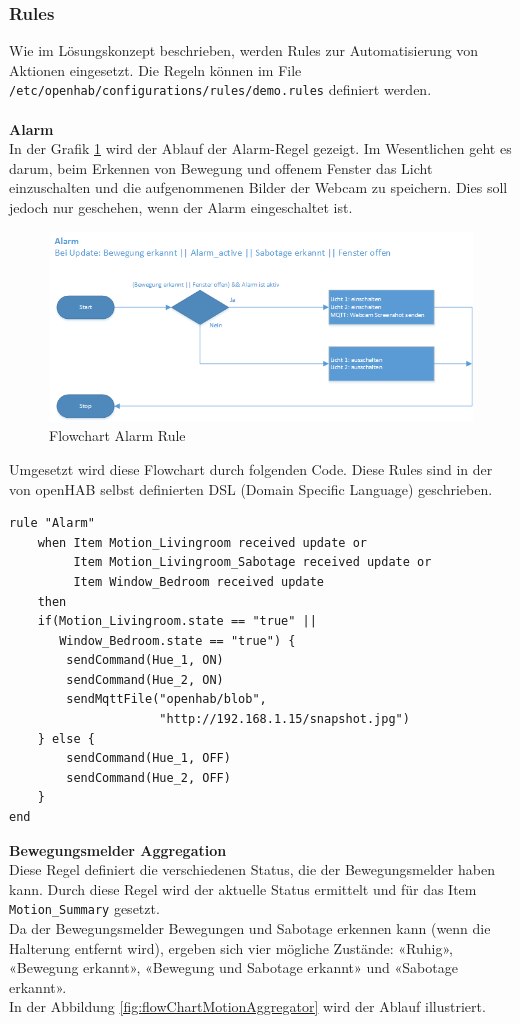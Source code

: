 \subsubsection{Rules}
Wie im Lösungskonzept beschrieben, werden Rules zur Automatisierung von Aktionen eingesetzt. Die Regeln können im File \lstinline!/etc/openhab/configurations/rules/demo.rules! definiert werden. \\\\
\textbf{Alarm} \\
In der Grafik \ref{fig:flowchartAlarm} wird der Ablauf der Alarm-Regel gezeigt. Im Wesentlichen geht es darum, beim Erkennen von Bewegung und offenem Fenster das Licht einzuschalten und die aufgenommenen Bilder der Webcam zu speichern. Dies soll jedoch nur geschehen, wenn der Alarm eingeschaltet ist.
\begin{figure}[H]
	\centering
		\includegraphics[scale=0.8]{report/img/RuleAlarm}
	\caption{Flowchart Alarm Rule}
	\label{fig:flowchartAlarm}
\end{figure}

Umgesetzt wird diese Flowchart durch folgenden Code. Diese Rules sind in der von openHAB selbst definierten DSL (Domain Specific Language) geschrieben.

\begin{lstlisting}[style=csharp, caption=demo.rules - Rule «Motion Aggregator»]
rule "Alarm"
	when Item Motion_Livingroom received update or
	     Item Motion_Livingroom_Sabotage received update or
	     Item Window_Bedroom received update
	then
	if(Motion_Livingroom.state == "true" ||
	   Window_Bedroom.state == "true") {
		sendCommand(Hue_1, ON)
		sendCommand(Hue_2, ON)
		sendMqttFile("openhab/blob",
					 "http://192.168.1.15/snapshot.jpg")
	} else {
		sendCommand(Hue_1, OFF)
		sendCommand(Hue_2, OFF)
	}
end
\end{lstlisting}

\textbf{Bewegungsmelder Aggregation} \\
Diese Regel definiert die verschiedenen Status, die der Bewegungsmelder haben kann. Durch diese Regel wird der aktuelle Status ermittelt und für das Item \lstinline!Motion_Summary! gesetzt. \\
Da der Bewegungsmelder Bewegungen und Sabotage erkennen kann (wenn die Halterung entfernt wird), ergeben sich vier mögliche Zustände: «Ruhig», «Bewegung erkannt», «Bewegung und Sabotage erkannt» und «Sabotage erkannt».\\
In der Abbildung \ref{fig:flowChartMotionAggregator} wird der Ablauf illustriert.

